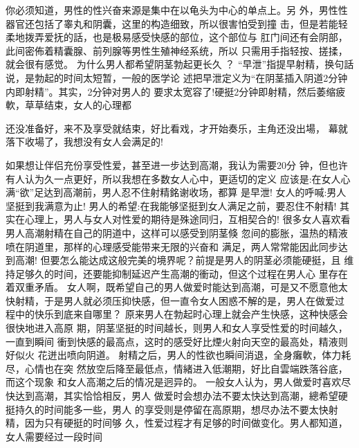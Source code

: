 \documentclass[12pt,UTF8]{ctexbook}
\begin{document}
你必须知道，男性的性兴奋来源是集中在以龟头为中心的单点上。另
外，男性性器官还包括了睾丸和阴囊，这里的构造细致，所以很害怕受到撞
击，但是若能轻柔地拨弄爱抚的話，也是极易感受快感的部位，这个部位与
肛门间还有会阴部，此间密佈着精囊腺、前列腺等男性生殖神经系统，所以
只需用手指轻按、搓揉，就会很有感觉。
为什么男人都希望阴茎勃起更长久 ？
“早泄”指提早射精，换句話说，是勃起的时间太短暂，一般的医学论
述把早泄定义为“在阴茎插入阴道2分钟内即射精”。其实，2分钟对男人的
要求太宽容了!硬挺2分钟即射精，然后萎缩疲軟，草草结束，女人的心理都

还没准备好，来不及享受就结束，好比看戏，才开始奏乐，主角还没出場，
幕就落下收場了，我想没有女人会满足的!

如果想让伴侣充份享受性爱，甚至进一步达到高潮，我认为需要20分
钟，但也许有人认为久一点更好，所以我想在多数女人心中，更适切的定义
应该是:在女人心满“欲”足达到高潮前，男人忍不住射精銘谢收场，都算
是早泄!
女人的呼喊:男人坚挺到我满意为止!
男人的希望:在我能够坚挺到女人满足之前，要忍住不射精!
其实在心理上，男人与女人对性爱的期待是殊途同归，互相契合的!
很多女人喜欢看男人高潮射精在自己的阴道中，这样可以感受到阴茎倏
忽间的膨胀，温热的精液喷在阴道里，那样的心理感受能带来无限的兴奋和
满足，两人常常能因此同步达到高潮!
但要怎么能达成这般完美的境界呢？前提是男人的阴茎必须能硬挺，且
维持足够久的时间，还要能抑制延迟产生高潮的衝动，但这个过程在男人心
里存在着双重矛盾。
女人啊，既希望自己的男人做爱时能达到高潮，可是又不愿意他太快射精，于是男人就必须压抑快感，但一直令女人困惑不解的是，男人在做爱过
程中的快乐到底来自哪里？
原来男人在勃起时心理上就会产生快感，这种快感会很快地进入高原
期，阴茎坚挺的时间越长，则男人和女人享受性爱的时间越久，一直到瞬间
衝到快感的最高点，这时的感受好比煙火射向天空的最高处，精液则好似火
花迸出喷向阴道。
射精之后，男人的性欲也瞬间消退，全身癱軟，体力耗尽，心情也在突
然放空后降至最低点，情緒进入低潮期，好比自雲端跌落谷底，而这个现象
和女人高潮之后的情况是迥异的。
一般女人认为，男人做爱时喜欢尽快达到高潮，其实恰恰相反，男人
做爱时会想办法不要太快达到高潮，總希望硬挺持久的时间能多一些，男人
的享受则是停留在高原期，想尽办法不要太快射精，因为只有硬挺的时间够
久，性爱过程才有足够的时间做变化。男人都知道，女人需要经过一段时间
\end{document}
